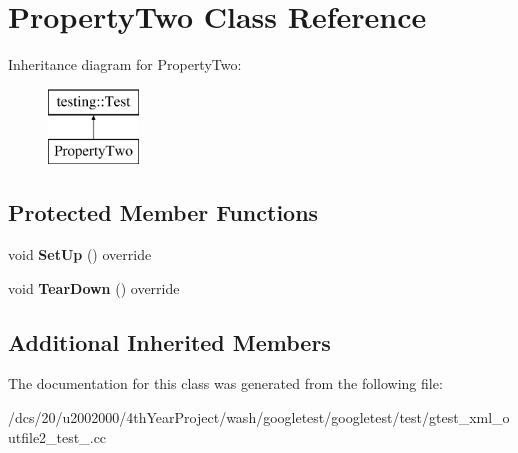 \hypertarget{classPropertyTwo}{}\section{Property\+Two Class Reference}
\label{classPropertyTwo}
Inheritance diagram for Property\+Two\+:\begin{figure}[H]
\begin{center}
\leavevmode
\includegraphics[height=2.000000cm]{classPropertyTwo}
\end{center}
\end{figure}
\subsection*{Protected Member Functions}
\begin{DoxyCompactItemize}
\item 
\mbox{\label{classPropertyTwo_a88216ddb0ed17e58c9f974a743208fca}} 
void {\bfseries Set\+Up} () override
\item 
\mbox{\label{classPropertyTwo_a8c2b36ef29249c5654f13bf8f504236a}} 
void {\bfseries Tear\+Down} () override
\end{DoxyCompactItemize}
\subsection*{Additional Inherited Members}


The documentation for this class was generated from the following file\+:\begin{DoxyCompactItemize}
\item 
/dcs/20/u2002000/4th\+Year\+Project/wash/googletest/googletest/test/gtest\+\_\+xml\+\_\+outfile2\+\_\+test\+\_\+.\+cc\end{DoxyCompactItemize}
